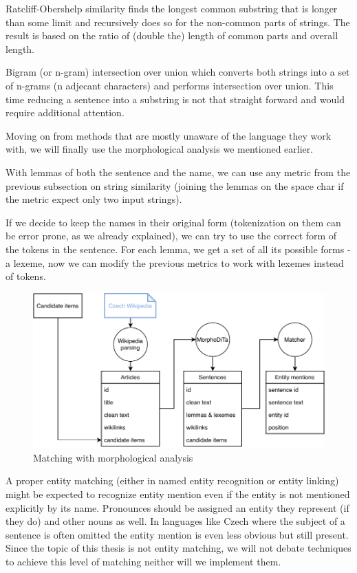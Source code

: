 Ratcliff-Obershelp similarity finds the longest common substring that is longer than some limit and recursively does so for the non-common parts of strings. The result is based on the ratio of (double the) length of common parts and overall length. 

Bigram (or n-gram) intersection over union which converts both strings into a set of n-grams (n adjecant characters) and performs intersection over union. This time reducing a sentence into a substring is not that straight forward and would require additional attention.


Moving on from methods that are mostly unaware of the language they work with, we will finally use the morphological analysis we mentioned earlier.

With lemmas of both the sentence and the name, we can use any metric from the previous subsection on string similarity (joining the lemmas on the space char if the metric expect only two input strings).

If we decide to keep the names in their original form (tokenization on them can be error prone, as we already explained), we can try to use the correct form of the tokens in the sentence. For each lemma, we get a set of all its possible forms - a lexeme, now we can modify the previous metrics to work with lexemes instead of tokens. 


\begin{figure}[h]\centering
\includegraphics[width=140mm]{./img/Diplomka diagramy-Detailed_text}
\caption{Matching with morphological analysis}
\label{obr:DiagramTextDetail}
\end{figure}



A proper entity matching (either in named entity recognition or entity linking) might be expected to recognize entity mention even if the entity is not mentioned explicitly by its name. Pronounces should be assigned an entity they represent (if they do) and other nouns as well. In languages like Czech where the subject of a sentence is often omitted the entity mention is even less obvious but still present. Since the topic of this thesis is not entity matching, we will not debate techniques to achieve this level of matching neither will we implement them.

